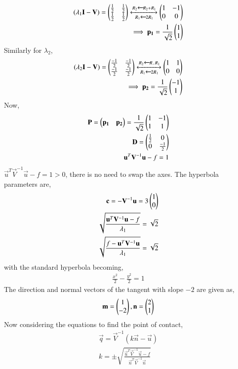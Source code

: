 \documentclass[journal,12pt,twocolumn]{IEEEtran}
\begin{document}
\begin{align}
    (\lambda_1 \mathbf{I}-\mathbf{V}) = \begin{pmatrix}\frac{1}{2}&\frac{1}{2}\\\frac{1}{2}&\frac{1}{2}\end{pmatrix}
    \xleftrightarrow[R_1\xleftarrow{}2R_1]{R_2\xleftarrow{}R_2+R_1}
    \begin{pmatrix}1&-1\\0&0\end{pmatrix} \\
    \implies \mathbf{p_1} = \frac{1}{\sqrt{2}}\begin{pmatrix}1\\1\end{pmatrix}
\end{align}
Similarly for $\lambda_2$,
\begin{align}
    (\lambda_2 \mathbf{I}-\mathbf{V}) = \begin{pmatrix}\frac{-1}{2}&\frac{-1}{2}\\\frac{-1}{2}&\frac{-1}{2}\end{pmatrix}
    \xleftrightarrow[R_1\xleftarrow{}2R_1]{R_2\xleftarrow{}R_-R_1}
    \begin{pmatrix}1&1\\0&0\end{pmatrix} \\
    \implies \mathbf{p_2} = \frac{1}{\sqrt{2}}\begin{pmatrix}-1\\1\end{pmatrix}
\end{align}
Now, 
\begin{align}
    \mathbf{P} = \begin{pmatrix}\mathbf{p_1}&\mathbf{p_2}\end{pmatrix} = \frac{1}{\sqrt{2}}\begin{pmatrix}1&-1\\1&1\end{pmatrix} \\
    \mathbf{D} = \begin{pmatrix}\frac{1}{2}&0\\0&\frac{-1}{2}\end{pmatrix} \\
    \mathbf{u}^T\mathbf{V}^{-1}\mathbf{u}-f=1
\end{align}
\because $\vec{u}^T\vec{V}^{-1}\vec{u}-f=1>0$, there is no need to swap the axes. The hyperbola parameters are, 
\begin{align}
    \mathbf{c} = -\mathbf{V}^{-1}\mathbf{u} = 3\begin{pmatrix}1\\0\end{pmatrix} \\
    \sqrt{\frac{\mathbf{u}^T\mathbf{V}^{-1}\mathbf{u}-f}{\lambda_1}}=\sqrt{2} \\
    \sqrt{\frac{f-\mathbf{u}^T\mathbf{V}^{-1}\mathbf{u}}{\lambda_1}}=\sqrt{2}
\end{align}
with the standard hyperbola becoming, 
\begin{align}
    \frac{x^2}{2}-\frac{y^2}{2}=1
\end{align}
The direction and normal vectors of the tangent with slope $-2$ are given as,
\begin{align}
    \mathbf{m}=\begin{pmatrix}1\\-2\end{pmatrix}, \mathbf{n}=\begin{pmatrix}2\\1\end{pmatrix}
\end{align}
Now considering the equations to find the point of contact, 
\begin{align}
    \vec{q}=\vec{V}^{-1}(k\vec{n}-\vec{u}) \\
    k = \pm \sqrt{\frac{\vec{u}^T\vec{V}^{-1}\vec{u}-f}{\vec{n}^T\vec{V}^{-1}\vec{n}}}
\end{align}
\end{document}
